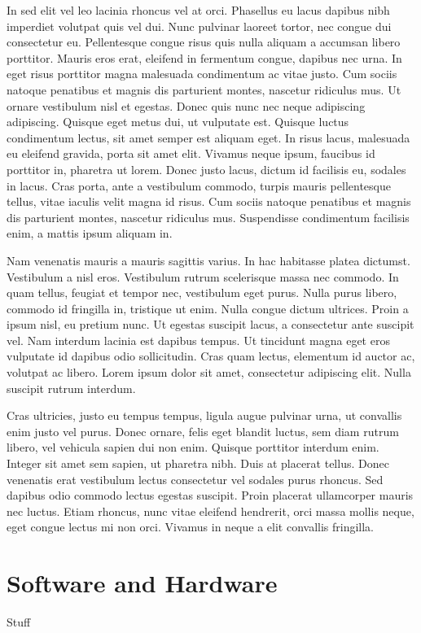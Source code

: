 \documentclass{acmsiggraph}
\begin{document}
In sed elit vel leo lacinia rhoncus vel at orci. Phasellus eu lacus dapibus nibh imperdiet volutpat quis vel dui. Nunc pulvinar laoreet tortor, nec congue dui consectetur eu. Pellentesque congue risus quis nulla aliquam a accumsan libero porttitor. Mauris eros erat, eleifend in fermentum congue, dapibus nec urna. In eget risus porttitor magna malesuada condimentum ac vitae justo. Cum sociis natoque penatibus et magnis dis parturient montes, nascetur ridiculus mus. Ut ornare vestibulum nisl et egestas. Donec quis nunc nec neque adipiscing adipiscing. Quisque eget metus dui, ut vulputate est. Quisque luctus condimentum lectus, sit amet semper est aliquam eget. In risus lacus, malesuada eu eleifend gravida, porta sit amet elit. Vivamus neque ipsum, faucibus id porttitor in, pharetra ut lorem. Donec justo lacus, dictum id facilisis eu, sodales in lacus. Cras porta, ante a vestibulum commodo, turpis mauris pellentesque tellus, vitae iaculis velit magna id risus. Cum sociis natoque penatibus et magnis dis parturient montes, nascetur ridiculus mus. Suspendisse condimentum facilisis enim, a mattis ipsum aliquam in.

Nam venenatis mauris a mauris sagittis varius. In hac habitasse platea dictumst. Vestibulum a nisl eros. Vestibulum rutrum scelerisque massa nec commodo. In quam tellus, feugiat et tempor nec, vestibulum eget purus. Nulla purus libero, commodo id fringilla in, tristique ut enim. Nulla congue dictum ultrices. Proin a ipsum nisl, eu pretium nunc. Ut egestas suscipit lacus, a consectetur ante suscipit vel. Nam interdum lacinia est dapibus tempus. Ut tincidunt magna eget eros vulputate id dapibus odio sollicitudin. Cras quam lectus, elementum id auctor ac, volutpat ac libero. Lorem ipsum dolor sit amet, consectetur adipiscing elit. Nulla suscipit rutrum interdum.

Cras ultricies, justo eu tempus tempus, ligula augue pulvinar urna, ut convallis enim justo vel purus. Donec ornare, felis eget blandit luctus, sem diam rutrum libero, vel vehicula sapien dui non enim. Quisque porttitor interdum enim. Integer sit amet sem sapien, ut pharetra nibh. Duis at placerat tellus. Donec venenatis erat vestibulum lectus consectetur vel sodales purus rhoncus. Sed dapibus odio commodo lectus egestas suscipit. Proin placerat ullamcorper mauris nec luctus. Etiam rhoncus, nunc vitae eleifend hendrerit, orci massa mollis neque, eget congue lectus mi non orci. Vivamus in neque a elit convallis fringilla.

\section{Software and Hardware}

Stuff

% 
% 
\end{document}
